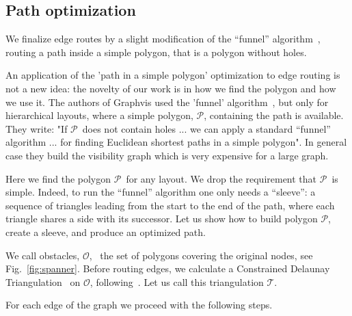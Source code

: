 \documentclass{gd-llncs}
\newcommand{\plg}{$\mathcal{P}$}
\begin{document}
\subsection*{Path optimization} {
We finalize edge routes by a slight modification of the “funnel” algorithm~\cite{chazelle1982theorem,hershberger1994computing}, routing a path inside a simple polygon, that is a polygon without holes.

An application of the 'path in a simple polygon' optimization to edge routing is not a new idea: the novelty of our work is in how we find the polygon and how we use it.
The authors of Graphvis used the 'funnel' algorithm~\cite{dobkin1997implementing}, but only for hierarchical layouts, where a simple polygon, \plg, containing the path is available. They write: "If \plg~does not contain holes ... we can apply a
standard “funnel” algorithm ... for finding Euclidean shortest paths in a simple polygon". In general case they build the visibility graph which is very expensive for a large graph.

Here we find the polygon \plg~for any layout. We drop the requirement that \plg~is simple. Indeed, to run the “funnel” algorithm one only needs a “sleeve”: a sequence of triangles leading from the start to the end of the path, where each triangle shares a side with its successor. Let us show how to build polygon \plg, create a sleeve, and produce an optimized path.

We call obstacles, $\mathcal{O}$, ~the set of polygons covering the original nodes, see Fig.~\ref{fig:spanner}. Before routing edges, we calculate a Constrained Delaunay Triangulation~\cite{delaunay1934sphere} on $\mathcal{O}$, following~\cite{domiter2008sweep}. Let us call this triangulation $\mathcal{T}$.

For each edge of the graph we proceed with the following steps.

}
\end{document}
